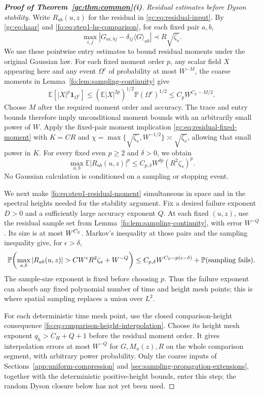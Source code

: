 \documentclass[11pt]{article}
\numberwithin{equation}{section}
\theoremstyle{remark}
\newcommand{\E}{\mathbb E}
\newcommand{\Prob}{\mathbb P}
\begin{document}
\begin{proof}[\textbf{Proof of Theorem~\ref{gc:thm:common}(i)}]
\emph{Residual estimates before Dyson stability.}
Write $R_{ab}(u,z)$ for the residual in \eqref{gc:eq:residual-input}.
By \eqref{gc:eq:haar} and \eqref{fo:eq:step1-hs-comparison}, for each
fixed pair $a,b$,
\[
 \max_{i,j}|G_{ai,bj}-\delta_{ij}\langle G\rangle_{ab}|
       \prec R\sqrt{\zeta_s}.
\]
We use these pointwise entry estimates to bound residual moments under
the original Gaussian law. For each fixed moment order $p$, any scalar
field $X$ appearing here and any event $\Omega^c$ of probability at most
$W^{-M}$, the coarse moments in Lemma~\ref{fo:lem:sampling-continuity}
give
\[
 \E[|X|^p\mathbf1_{\Omega^c}]
 \le(\E|X|^{2p})^{1/2}\Prob(\Omega^c)^{1/2}
 \le C_pW^{C_p-M/2}.
\]
Choose $M$ after the required moment order and accuracy. The trace and
entry bounds therefore imply unconditional moment bounds with an
arbitrarily small power of $W$. Apply the fixed-pair moment implication
\eqref{gc:eq:residual-fixed-moment} with $K=CR$ and
$\chi=\max\{\sqrt{\zeta_s},W^{-1/2}\}\asymp\sqrt{\zeta_s}$,
allowing that small power in $K$. For every fixed even $p\ge2$ and
$\delta>0$, we obtain
\begin{equation}\label{fo:eq:step1-residual-moment}
 \max_{a,b}\E|R_{ab}(u,z)|^p
       \le C_{p,\delta}W^{\delta p}(R^2\zeta_s)^p.
\end{equation}
No Gaussian calculation is conditioned on a sampling or stopping event.

We next make \eqref{fo:eq:step1-residual-moment} simultaneous in space
and in the spectral heights needed for the stability argument. Fix a
desired failure exponent $D>0$ and a sufficiently large accuracy exponent
$Q$. At each fixed $(u,z)$, use the residual sample set from
Lemma~\ref{fo:lem:sampling-continuity}, with error $W^{-Q}$. Its size is at most $W^{C_{\rm S}}$. Markov's
inequality at those pairs and the sampling inequality give, for
$\epsilon>\delta$,
\[
 \Prob\!\left(\max_{a,b}|R_{ab}(u,z)|
                  >CW^\epsilon R^2\zeta_s+W^{-Q}\right)
 \le C_{p,\delta}W^{C_{\rm S}-p(\epsilon-\delta)}
       +\Prob(\text{sampling fails}).
\]
The sample-size exponent is fixed before choosing $p$. Thus the failure
exponent can absorb any fixed polynomial number of time and height
mesh points; this is where spatial sampling replaces a union over $L^2$.

For each deterministic time mesh point, use the closed comparison-height
consequence \eqref{fo:eq:comparison-height-interpolation}. Choose its
height mesh exponent $q_h>C_H+Q+1$ before the residual moment order.
It gives interpolation errors at most $W^{-Q}$ for $G,M_u(z),R$ on
the whole comparison segment, with arbitrary power probability.
Only the coarse inputs of Sections~\ref{app:uniform-compression} and
\ref{sec:sampling-propagation-extensions}, together with the deterministic
positive-height bounds, enter this step; the random Dyson
closure below has not yet been used.


\end{proof}
\end{document}
